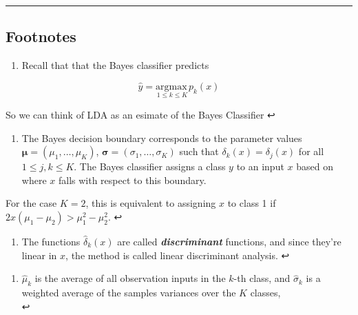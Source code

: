 \documentclass[11pt]{article}
\providecommand{\tightlist}{%
      \setlength{\itemsep}{0pt}\setlength{\parskip}{0pt}}
\begin{document}
    \begin{center}\rule{0.5\linewidth}{\linethickness}\end{center}

\hypertarget{footnotes}{%
\subsection{Footnotes}\label{footnotes}}

    \hypertarget{foot25}{}
\begin{enumerate}
\def\labelenumi{\arabic{enumi}.}
\setcounter{enumi}{24}
\tightlist
\item
  Recall that that the Bayes classifier predicts
\end{enumerate}

\[\hat{y} = \underset{1 \leqslant k \leqslant K}{\text{argmax}\,} p_k(x) \]

So we can think of LDA as an esimate of the Bayes Classifier ↩

\hypertarget{foot26}{}
\begin{enumerate}
\def\labelenumi{\arabic{enumi}.}
\setcounter{enumi}{25}
\tightlist
\item
  The Bayes decision boundary corresponds to the parameter values
  \(\boldsymbol{\mu} = (\mu_1, \dots, \mu_K)\),
  \(\boldsymbol{\sigma} = (\sigma_1, \dots, \sigma_K)\) such that
  \(\delta_k(x) = \delta_j(x)\) for all \(1 \leqslant j,k \leqslant K\).
  The Bayes classifier assigns a class \(y\) to an input \(x\) based on
  where \(x\) falls with respect to this boundary.
\end{enumerate}

For the case \(K=2\), this is equivalent to assigning \(x\) to class 1
if \(2x(\mu_1 - \mu_2) > \mu_1^2 - \mu_2^2\). ↩

\hypertarget{foot27}{}
\begin{enumerate}
\def\labelenumi{\arabic{enumi}.}
\setcounter{enumi}{26}
\tightlist
\item
  The functions \(\hat{\delta}_k(x)\) are called
  \textbf{\emph{discriminant}} functions, and since they're linear in
  \(x\), the method is called linear discriminant analysis. ↩
\end{enumerate}

\hypertarget{foot28}{}
\begin{enumerate}
\def\labelenumi{\arabic{enumi}.}
\setcounter{enumi}{27}
\tightlist
\item
  \(\hat{\mu}_k\) is the average of all observation inputs in the
  \(k\)-th class, and \(\hat{\sigma}_k\) is a weighted average of the
  samples variances over the \(K\) classes,\\
  ↩
\end{enumerate}
\end{document}
